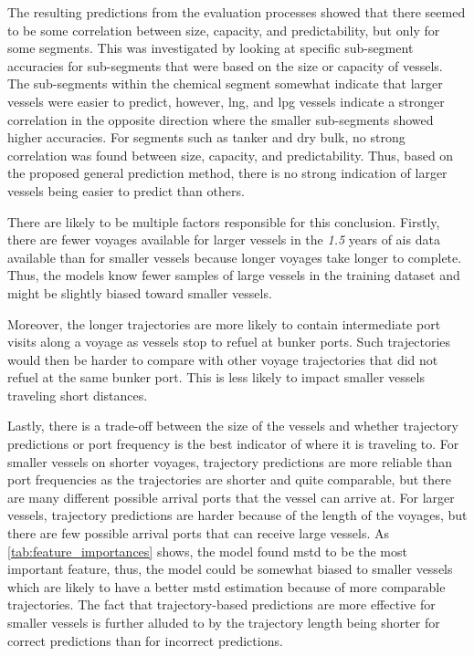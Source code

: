 The resulting predictions from the evaluation processes showed that there seemed to be some correlation between size, capacity, and predictability, but only for some segments. This was investigated by looking at specific sub-segment accuracies for sub-segments that were based on the size or capacity of vessels. The sub-segments within the chemical segment somewhat indicate that larger vessels were easier to predict, however, \acrshort{lng}, and \acrshort{lpg} vessels indicate a stronger correlation in the opposite direction where the smaller sub-segments showed higher accuracies. For segments such as tanker and dry bulk, no strong correlation was found between size, capacity, and predictability. Thus, based on the proposed general prediction method, there is no strong indication of larger vessels being easier to predict than others.

There are likely to be multiple factors responsible for this conclusion. Firstly, there are fewer voyages available for larger vessels in the \textit{1.5} years of \acrshort{ais} data available than for smaller vessels because longer voyages take longer to complete. Thus, the models know fewer samples of large vessels in the training dataset and might be slightly biased toward smaller vessels.

Moreover, the longer trajectories are more likely to contain intermediate port visits along a voyage as vessels stop to refuel at bunker ports. Such trajectories would then be harder to compare with other voyage trajectories that did not refuel at the same bunker port. This is less likely to impact smaller vessels traveling short distances.

Lastly, there is a trade-off between the size of the vessels and whether trajectory predictions or port frequency is the best indicator of where it is traveling to. For smaller vessels on shorter voyages, trajectory predictions are more reliable than port frequencies as the trajectories are shorter and quite comparable, but there are many different possible arrival ports that the vessel can arrive at. For larger vessels, trajectory predictions are harder because of the length of the voyages, but there are few possible arrival ports that can receive large vessels. As \cref{tab:feature_importances} shows, the model found \acrshort{mstd} to be the most important feature, thus, the model could be somewhat biased to smaller vessels which are likely to have a better \acrshort{mstd} estimation because of more comparable trajectories. The fact that trajectory-based predictions are more effective for smaller vessels is further alluded to by the trajectory length being shorter for correct predictions than for incorrect predictions.

